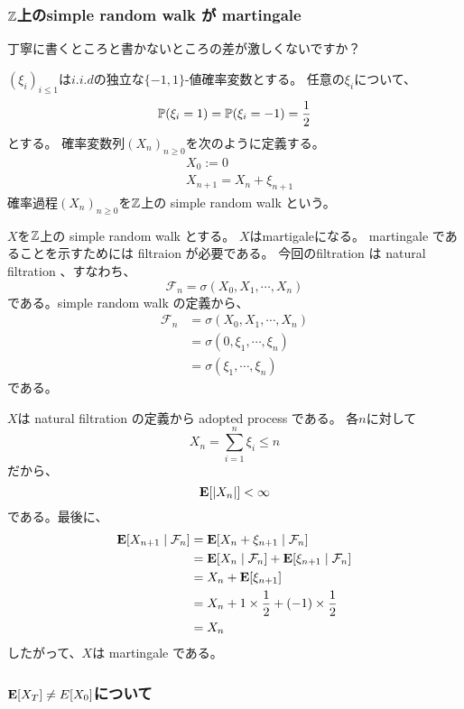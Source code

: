       \subsubsection{${\mathbb{Z}}$上のsimple random walk が martingale}
        丁寧に書くところと書かないところの差が激しくないですか？

        \begin{def*}
          $(\xi_i)_{i \leq 1}$は$i.i.d$の独立な$\{-1, 1\}$-値確率変数とする。
          任意の$\xi_i$について、
          \[
            {\mathbb{P}}(\xi_i = 1) = {\mathbb{P}}(\xi_i = -1) = \frac{1}{2}
          \]
          とする。
          確率変数列$(X_n)_{n \ge 0}$を次のように定義する。
          \begin{align*}
            &X_0 := 0 \\
            &X_{n+1} = X_n + \xi_{n+1}
          \end{align*}
          確率過程$(X_n)_{n \ge 0}$を${\mathbb{Z}}$上の simple random walk という。
        \end{def*}

        $X$を${\mathbb{Z}}$上の simple random walk とする。
        $X$はmartigaleになる。
        martingale であることを示すためには filtraion が必要である。
        今回のfiltration は natural filtration 、すなわち、
        \[
          \mathcal{F}_n = \sigma(X_0,X_1, \cdots , X_n)
        \]
        である。simple random walk の定義から、
        \begin{align*}
          \mathcal{F}_n &= \sigma(X_0,X_1, \cdots , X_n)\\
          &= \sigma(0, \xi_1, \cdots ,\xi_n) \\
          &= \sigma(\xi_1, \cdots ,\xi_n)
        \end{align*}
        である。

        $X$は natural filtration の定義から adopted process である。
        各$n$に対して
        \[
          X_n = \sum_{i = 1}^{n} \xi_i \leq n
        \]
        だから、
        \[
          {\mathbf{E}}[|X_n|] < \infty
        \]
        である。最後に、
        \begin{align*}
          {\mathbf{E}}[X_{n+1} \mid \mathcal{F}_n] &= {\mathbf{E}}[X_{n} + \xi_{n + 1} \mid \mathcal{F}_n]\\
          &= {\mathbf{E}}[X_{n} \mid \mathcal{F}_n] + {\mathbf{E}}[\xi_{n + 1} \mid \mathcal{F}_n] \\
          &= X_{n} + {\mathbf{E}}[\xi_{n + 1}] \\
          &= X_{n} + 1 \times \frac{1}{2} + (-1) \times \frac{1}{2}\\
          &= X_{n}
        \end{align*}
        したがって、$X$は martingale である。

      \subsubsection{${\mathbf{E}}[X_T] \neq E[X_0]$について}
